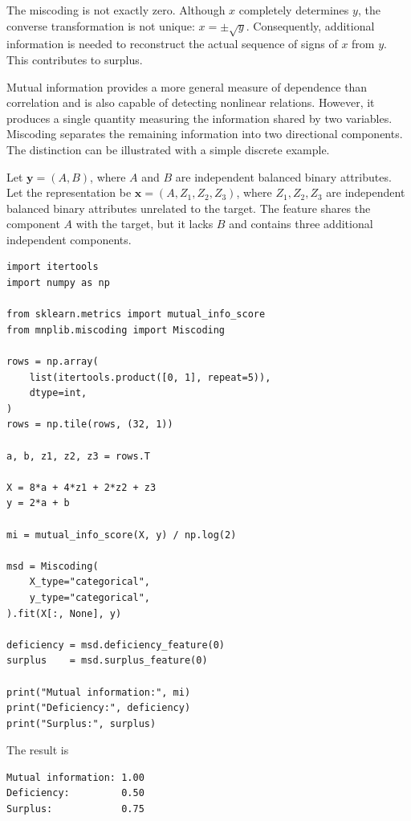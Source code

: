 The miscoding is not exactly zero. Although $x$ completely determines $y$, the converse transformation is not unique: $x=\pm\sqrt{y}$. Consequently, additional information is needed to reconstruct the actual sequence of signs of $x$ from $y$. This contributes to surplus.

Mutual information provides a more general measure of dependence than correlation and is also capable of detecting nonlinear relations. However, it produces a single quantity measuring the information shared by two variables. Miscoding separates the remaining information into two directional components. The distinction can be illustrated with a simple discrete example.

\begin{example}
Let $\mathbf{y}=(A,B)$, where $A$ and $B$ are independent balanced binary attributes. Let the representation be $\mathbf{x}=(A,Z_1,Z_2,Z_3)$, where $Z_1,Z_2,Z_3$ are independent balanced binary attributes unrelated to the target. The feature shares the component $A$ with the target, but it lacks $B$ and contains three additional independent components.

\begin{sourcecode}
{\scriptsize \begin{verbatim}
import itertools
import numpy as np

from sklearn.metrics import mutual_info_score
from mnplib.miscoding import Miscoding

rows = np.array(
    list(itertools.product([0, 1], repeat=5)),
    dtype=int,
)
rows = np.tile(rows, (32, 1))

a, b, z1, z2, z3 = rows.T

X = 8*a + 4*z1 + 2*z2 + z3
y = 2*a + b

mi = mutual_info_score(X, y) / np.log(2)

msd = Miscoding(
    X_type="categorical",
    y_type="categorical",
).fit(X[:, None], y)

deficiency = msd.deficiency_feature(0)
surplus    = msd.surplus_feature(0)

print("Mutual information:", mi)
print("Deficiency:", deficiency)
print("Surplus:", surplus)
\end{verbatim}}
\end{sourcecode}

The result is

\begin{sourcecode}
{\scriptsize \begin{verbatim}
Mutual information: 1.00
Deficiency:         0.50
Surplus:            0.75
\end{verbatim}}
\end{sourcecode}


\end{example}
